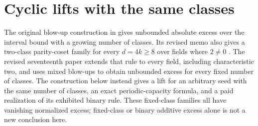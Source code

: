 \section{Cyclic lifts with the same classes}\label{sec:constructions}

The original blow-up construction in \cite{ClassUniformMemo2026} gives
unbounded absolute excess over the interval bound with a growing number
of classes. Its revised memo also gives a two-class parity-coset family
for every $d=4k\ge8$ over fields where $2\ne0$
\cite[Theorem~4.8]{ClassUniformMemo2026}. The revised seventeenth paper
extends that rule to every field, including characteristic two, and uses
mixed blow-ups to obtain unbounded excess for every fixed number of
classes\cite{SeventeenthPaper2026}.
The construction below instead gives a lift for an arbitrary seed with
the same number of classes, an exact periodic-capacity formula, and a
paid realization of its exhibited binary rule. These fixed-class families
all have vanishing normalized excess; fixed-class or binary additive
excess alone is not a new conclusion here.

